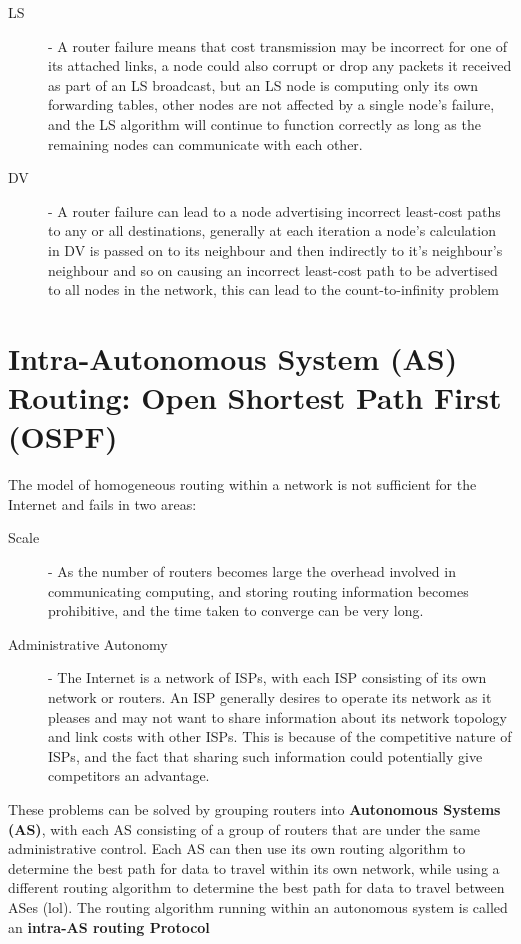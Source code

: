 \documentclass[12pt letter]{report}
\begin{document}
\begin{description}
    \begin{description}
      \item[LS]  - A router failure means that cost transmission may
        be incorrect for one of its attached links, a node could also
        corrupt or drop any packets it received as part of an LS
        broadcast, but an LS node is computing only its own
        forwarding tables, other nodes are not affected by a single
        node's failure, and the LS algorithm will continue to
        function correctly as long as the remaining nodes can
        communicate with each other.
      \item[DV] - A router failure can lead to a node advertising
        incorrect least-cost paths to any or all destinations,
        generally at each iteration a node's calculation in DV is
        passed on to its neighbour and then indirectly to it's
        neighbour's neighbour and so on causing an incorrect
        least-cost path to be advertised to all nodes in the network,
        this can lead to the count-to-infinity problem
    \end{description}
\end{description}

\chapter{Intra-Autonomous System (AS) Routing: Open Shortest Path
First (OSPF)}

The model of homogeneous routing within a network is not sufficient
for the Internet and fails in two areas:
\begin{description}
  \item[Scale] - As the number of routers becomes large the overhead
    involved in communicating computing, and storing routing
    information becomes prohibitive, and the time taken to converge
    can be very long.
  \item[Administrative Autonomy] - The Internet is a network of ISPs,
    with each ISP consisting of its own network or routers. An ISP
    generally desires to operate its network as it pleases and may
    not want to share information about its network topology and link
    costs with other ISPs. This is because of the competitive nature
    of ISPs, and the fact that sharing such information could
    potentially give competitors an advantage.
\end{description}

These problems can be solved by grouping routers into
\textbf{Autonomous Systems (AS)}, with each AS consisting of a group
of routers that are under the same administrative control. Each AS
can then use its own routing algorithm to determine the best path for
data to travel within its own network, while using a different
routing algorithm to determine the best path for data to travel
between ASes (lol). The routing algorithm running within an
autonomous system is called an \textbf{intra-AS routing Protocol}
\end{document}
